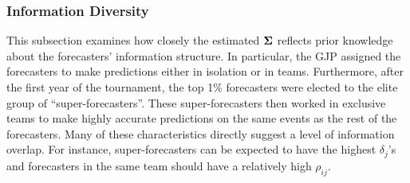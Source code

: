 \documentclass[11pt]{article}
\theoremstyle{definition}
\theoremstyle{definition}
\def\bSigma{{\bf \Sigma}}
\begin{document}
\subsubsection{Information Diversity}

This subsection examines how closely the estimated $\bSigma$ reflects prior knowledge about the forecasters' information structure. 
 In particular, the GJP assigned the forecasters to make predictions either in isolation or in teams. Furthermore, after the first year of the tournament, the top 1\% forecasters were elected to the elite group of ``super-forecasters''. These super-forecasters then worked in exclusive teams to make highly accurate predictions on the same events as the rest of the forecasters. Many of these characteristics directly suggest a level of information overlap. For instance, super-forecasters can be expected to have the highest $\delta_j$'s and forecasters in the same team should have a relatively high $\rho_{ij}$. 

\end{document}
